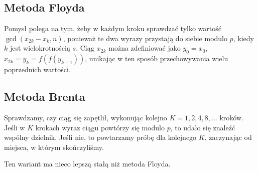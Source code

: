 \subsection{Metoda Floyda}
Pomysł polega na tym, żeby w każdym kroku sprawdzać tylko wartość \( \gcd(x_{2k} - x_k, n) \), ponieważ te dwa wyrazy przystają do siebie modulo \( p \), kiedy \( k \) jest wielokrotnością \( s \).
Ciąg \( x_{2k} \) można zdefiniować jako \( y_0 = x_0 \), \( x_{2k} = y_k = f(f(y_{k-1})) \), unikając w ten sposób przechowywania wielu poprzednich wartości.

\subsection{Metoda Brenta}
Sprawdzamy, czy ciąg się zapętlił, wykonując kolejno \( K = 1, 2, 4, 8, \dots \) kroków. Jeśli w \( K \) krokach wyraz ciągu powtórzy się modulo \( p \), to udało się znaleźć wspólny dzielnik. Jeśli nie, to powtarzamy próbę dla kolejnego \( K \), zaczynając od miejsca, w którym skończyliśmy.

Ten wariant ma nieco lepszą stałą niż metoda Floyda.